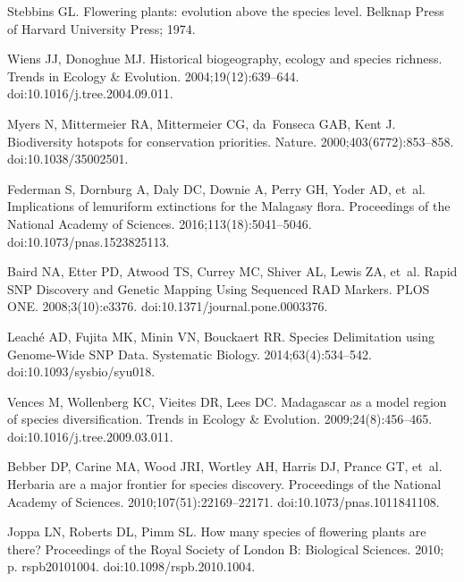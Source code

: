 \documentclass[10pt,letterpaper]{article}
\begin{document}
\begin{thebibliography}{10}

  Stebbins GL.
  \newblock Flowering plants: evolution above the species level.
  \newblock Belknap Press of Harvard University Press; 1974.

  Wiens JJ, Donoghue MJ.
  \newblock Historical biogeography, ecology and species richness.
  \newblock Trends in Ecology \& Evolution. 2004;19(12):639--644.
  \newblock doi:{10.1016/j.tree.2004.09.011}.

  Myers N, Mittermeier RA, Mittermeier CG, da~Fonseca GAB, Kent J.
  \newblock Biodiversity hotspots for conservation priorities.
  \newblock Nature. 2000;403(6772):853--858.
  \newblock doi:{10.1038/35002501}.

  Federman S, Dornburg A, Daly DC, Downie A, Perry GH, Yoder AD, et~al.
  \newblock Implications of lemuriform extinctions for the {Malagasy} flora.
  \newblock Proceedings of the National Academy of Sciences.
  2016;113(18):5041--5046.
  \newblock doi:{10.1073/pnas.1523825113}.

  Baird NA, Etter PD, Atwood TS, Currey MC, Shiver AL, Lewis ZA, et~al.
  \newblock Rapid {SNP} {Discovery} and {Genetic} {Mapping} {Using} {Sequenced}
  {RAD} {Markers}.
  \newblock PLOS ONE. 2008;3(10):e3376.
  \newblock doi:{10.1371/journal.pone.0003376}.

  Leaché AD, Fujita MK, Minin VN, Bouckaert RR.
  \newblock Species {Delimitation} using {Genome}-{Wide} {SNP} {Data}.
  \newblock Systematic Biology. 2014;63(4):534--542.
  \newblock doi:{10.1093/sysbio/syu018}.

  Vences M, Wollenberg KC, Vieites DR, Lees DC.
  \newblock Madagascar as a model region of species diversification.
  \newblock Trends in Ecology \& Evolution. 2009;24(8):456--465.
  \newblock doi:{10.1016/j.tree.2009.03.011}.

  Bebber DP, Carine MA, Wood JRI, Wortley AH, Harris DJ, Prance GT, et~al.
  \newblock Herbaria are a major frontier for species discovery.
  \newblock Proceedings of the National Academy of Sciences.
  2010;107(51):22169--22171.
  \newblock doi:{10.1073/pnas.1011841108}.

  Joppa LN, Roberts DL, Pimm SL.
  \newblock How many species of flowering plants are there?
  \newblock Proceedings of the Royal Society of London B: Biological Sciences.
  2010; p. rspb20101004.
  \newblock doi:{10.1098/rspb.2010.1004}.


\end{thebibliography}
\end{document}
